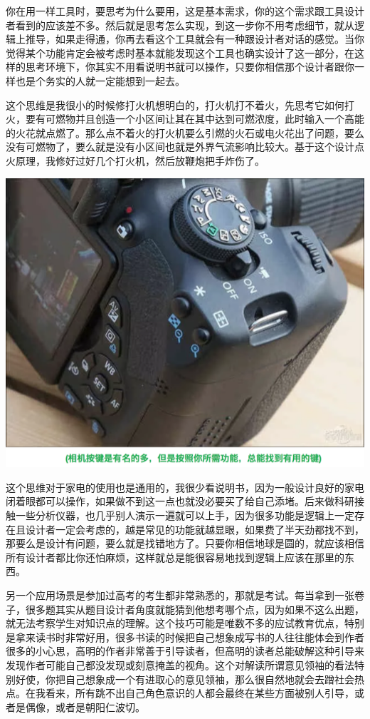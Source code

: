 \documentclass[
]{book}
\begin{document}
你在用一样工具时，要思考为什么要用，这是基本需求，你的这个需求跟工具设计者看到的应该差不多。然后就是思考怎么实现，到这一步你不用考虑细节，就从逻辑上推导，如果走得通，你再去看这个工具就会有一种跟设计者对话的感觉。当你觉得某个功能肯定会被考虑时基本就能发现这个工具也确实设计了这一部分，在这样的思考环境下，你其实不用看说明书就可以操作，只要你相信那个设计者跟你一样也是个务实的人就一定能想到一起去。

这个思维是我很小的时候修打火机想明白的，打火机打不着火，先思考它如何打火，要有可燃物并且创造一个小区间让其在其中达到可燃浓度，此时输入一个高能的火花就点燃了。那么点不着火的打火机要么引燃的火石或电火花出了问题，要么没有可燃物了，要么就是没有小区间也就是外界气流影响比较大。基于这个设计点火原理，我修好过好几个打火机，然后放鞭炮把手炸伤了。

\includegraphics[width=8.33in]{images/sheji3}

这个思维对于家电的使用也是通用的，我很少看说明书，因为一般设计良好的家电闭着眼都可以操作，如果做不到这一点也就没必要买了给自己添堵。后来做科研接触一些分析仪器，也几乎别人演示一遍就可以上手，因为很多功能是逻辑上一定存在且设计者一定会考虑的，越是常见的功能就越显眼，如果费了半天劲都找不到，那要么是设计有问题，要么就是找错地方了。只要你相信地球是圆的，就应该相信所有设计者都比你还怕麻烦，这样就总是能很容易地找到逻辑上应该在那里的东西。

另一个应用场景是参加过高考的考生都非常熟悉的，那就是考试。每当拿到一张卷子，很多题其实从题目设计者角度就能猜到他想考哪个点，因为如果不这么出题，就无法考察学生对知识点的理解。这个技巧可能是唯数不多的应试教育优点，特别是拿来读书时非常好用，很多书读的时候把自己想象成写书的人往往能体会到作者很多的小心思，高明的作者非常善于引导读者，但高明的读者总能破解这种引导来发现作者可能自己都没发现或刻意掩盖的视角。这个对解读所谓意见领袖的看法特别好使，你把自己想象成一个有进取心的意见领袖，那么很自然地就会去蹭社会热点。在我看来，所有跳不出自己角色意识的人都会最终在某些方面被别人引导，或者是偶像，或者是朝阳仁波切。
\end{document}
